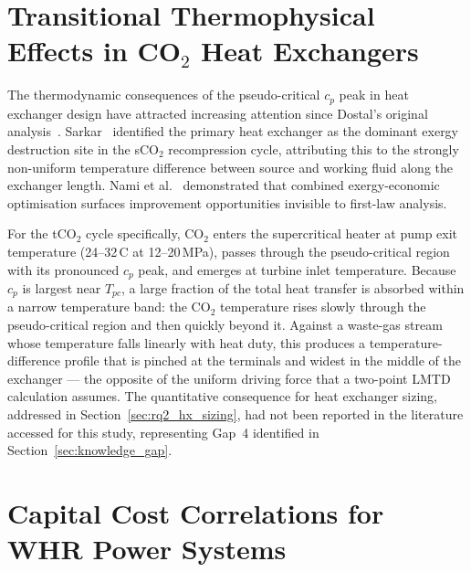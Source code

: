 \section{Transitional Thermophysical Effects in CO$_2$ Heat Exchangers}
\label{sec:lit_transitional}

The thermodynamic consequences of the pseudo-critical $c_p$ peak in heat
exchanger design have attracted increasing attention since Dostal's original
analysis~\cite{Dostal2004}. Sarkar~\cite{Sarkar2009} identified the primary
heat exchanger as the dominant exergy destruction site in the sCO$_2$
recompression cycle, attributing this to the strongly non-uniform temperature
difference between source and working fluid along the exchanger length. Nami
et al.~\cite{Nami2017} demonstrated that combined exergy-economic optimisation
surfaces improvement opportunities invisible to first-law analysis.

For the tCO$_2$ cycle specifically, CO$_2$ enters the supercritical heater at
pump exit temperature (24--32\,\textdegree C at 12--20\,MPa), passes through
the pseudo-critical region with its pronounced $c_p$ peak, and emerges at
turbine inlet temperature. Because $c_p$ is largest near $T_{pc}$, a large
fraction of the total heat transfer is absorbed within a narrow temperature
band: the CO$_2$ temperature rises slowly through the pseudo-critical region
and then quickly beyond it. Against a waste-gas stream whose temperature falls
linearly with heat duty, this produces a temperature-difference profile that
is pinched at the terminals and widest in the middle of the exchanger --- the
opposite of the uniform driving force that a two-point LMTD calculation
assumes. The quantitative consequence for heat exchanger sizing, addressed in
Section~\ref{sec:rq2_hx_sizing}, had not been reported in the literature
accessed for this study, representing Gap~4 identified in
Section~\ref{sec:knowledge_gap}.

\section{Capital Cost Correlations for WHR Power Systems}
\label{sec:lit_cost}


